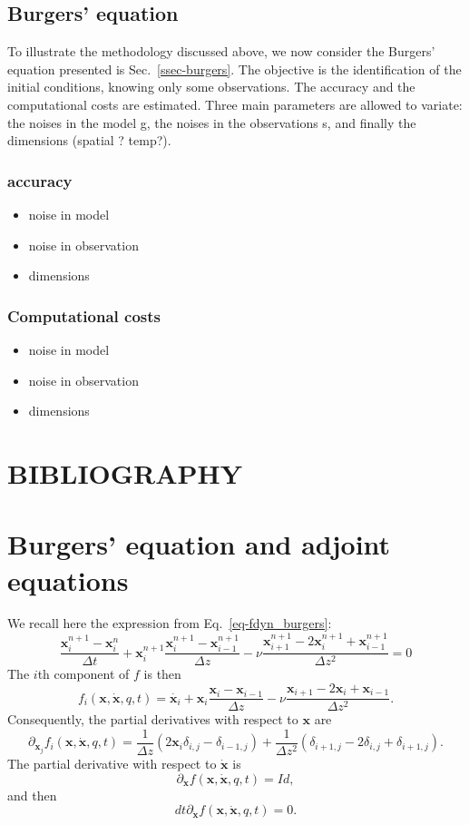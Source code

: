 \documentclass[aip,pof,nofootinbib,reprint,onecolumn]{revtex4-1}
\newcommand{\gras}[1]{\boldsymbol{#1}}
\newcommand{\mypar}[1]{\left(#1\right)}
\newcommand{\fdyn}{f} %
\newcommand{\point}{\gras{x}} %
\begin{document}
%

\subsection{Burgers' equation}  \label{ssec-results-burgers}
To illustrate the methodology discussed above, we now consider the Burgers' equation presented is Sec.~\ref{ssec-burgers}.
The objective is the identification of the initial conditions, knowing only some observations. 
The accuracy and the computational costs are estimated. 
Three main parameters are allowed to variate: the noises in the model g, the noises in the observations s, and finally the dimensions (spatial ? temp?).

\subsubsection{accuracy}
\begin{itemize}
\item noise in model
\item noise in observation
\item dimensions
\end{itemize}
\subsubsection{Computational costs}
\begin{itemize}
\item noise in model
\item noise in observation
\item dimensions
\end{itemize}



\section*{BIBLIOGRAPHY}


\appendix
\section{Burgers' equation and adjoint equations}
\label{an-burgers}
We recall here the expression from Eq.~\eqref{eq-fdyn_burgers}:
$$ \frac{\point^{n+1}_i - \point^{n}_i}{\Delta t} + \point^{n+1}_i \frac{\point^{n+1}_i - \point^{n+1}_{i-1}}{\Delta z} - \nu \frac{\point^{n+1}_{i+1} -2 \point^{n+1}_i + \point^{n+1}_{i-1}}{\Delta z ^2} = 0 $$
The $i$th component of $\fdyn$ is then
$$\fdyn_i\mypar{\point,\dot{\point},q,t} = \dot{\point_i} + \point_i \frac{\point_i - \point_{i-1}}{\Delta z} - \nu \frac{\point_{i+1} -2 \point_i + \point_{i-1}}{\Delta z ^2}. $$
Consequently, the partial derivatives with respect to $\point$ are
$$\partial_{\point_j} \fdyn_i\mypar{\point,\dot{\point},q,t} = \frac{1}{\Delta z }\mypar{2 \point_i \delta_{i,j} - \delta_{i-1,j}} + \frac{1}{\Delta z ^2}\mypar{\delta_{i+1,j} - 2 \delta_{i,j} + \delta_{i+1,j}}.$$
The partial derivative with respect to $\dot{\point}$ is
$$\partial_{\dot{\point}} \fdyn\mypar{\point,\dot{\point},q,t}  = Id,$$
and then $$dt\partial_{\dot{\point}} \fdyn\mypar{\point,\dot{\point},q,t}  = 0. $$
\end{document}
